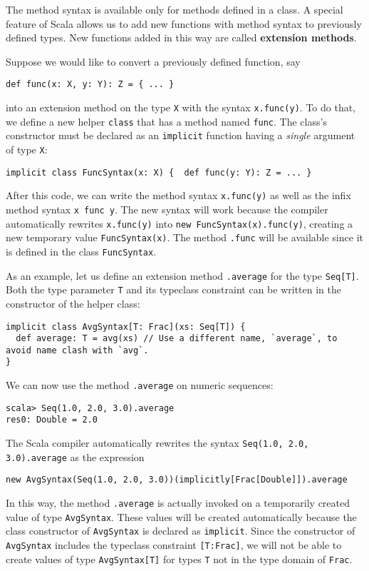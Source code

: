 The method syntax is available only for methods defined in a class.
A special feature of Scala allows us to add new functions with method
syntax to previously defined types. New functions added in this way
are called \textbf{extension methods}. 

Suppose we would like to convert a previously defined function, say
\begin{lstlisting}
def func(x: X, y: Y): Z = { ... }
\end{lstlisting}
into an extension method on the type \lstinline!X! with the syntax
\lstinline!x.func(y)!. To do that, we define a new helper \lstinline!class!
that has a method named \lstinline!func!. The class's constructor
must be declared as an \lstinline!implicit! function having a \emph{single}
argument of type \lstinline!X!:
\begin{lstlisting}
implicit class FuncSyntax(x: X) {  def func(y: Y): Z = ... }
\end{lstlisting}
After this code, we can write the method syntax \lstinline!x.func(y)!
as well as the infix method syntax \lstinline!x func y!. The new
syntax will work because the compiler automatically rewrites \lstinline!x.func(y)!
into \lstinline!new FuncSyntax(x).func(y)!, creating a new temporary
value \lstinline!FuncSyntax(x)!. The method \lstinline!.func! will
be available since it is defined in the class \lstinline!FuncSyntax!. 

As an example, let us define an extension method \lstinline!.average!
for the type \lstinline!Seq[T]!. Both the type parameter \lstinline!T!
and its typeclass constraint can be written in the constructor of
the helper class:
\begin{lstlisting}
implicit class AvgSyntax[T: Frac](xs: Seq[T]) {
  def average: T = avg(xs) // Use a different name, `average`, to avoid name clash with `avg`.
}
\end{lstlisting}
We can now use the method \lstinline!.average! on numeric sequences:
\begin{lstlisting}
scala> Seq(1.0, 2.0, 3.0).average
res0: Double = 2.0
\end{lstlisting}
The Scala compiler automatically rewrites the syntax \lstinline!Seq(1.0, 2.0, 3.0).average!
as the expression
\begin{lstlisting}
new AvgSyntax(Seq(1.0, 2.0, 3.0))(implicitly[Frac[Double]]).average
\end{lstlisting}
In this way, the method \lstinline!.average! is actually invoked
on a temporarily created value of type \lstinline!AvgSyntax!. These
values will be created automatically because the class constructor
of \lstinline!AvgSyntax! is declared as \lstinline!implicit!. Since
the constructor of \lstinline!AvgSyntax! includes the typeclass constraint
\lstinline![T:Frac]!, we will not be able to create values of type
\lstinline!AvgSyntax[T]! for types \lstinline!T! not in the type
domain of \lstinline!Frac!.

